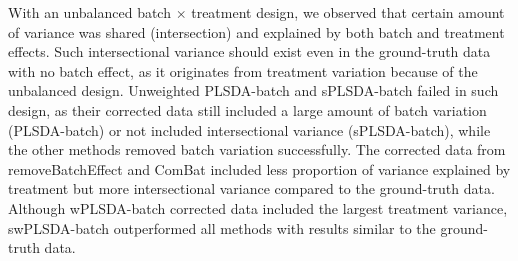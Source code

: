 \documentclass[
]{book}
\begin{document}
With an unbalanced batch \(\times\) treatment design, we observed that certain amount of variance was shared (intersection) and explained by both batch and treatment effects. Such intersectional variance should exist even in the ground-truth data with no batch effect, as it originates from treatment variation because of the unbalanced design. Unweighted PLSDA-batch and sPLSDA-batch failed in such design, as their corrected data still included a large amount of batch variation (PLSDA-batch) or not included intersectional variance (sPLSDA-batch), while the other methods removed batch variation successfully. The corrected data from removeBatchEffect and ComBat included less proportion of variance explained by treatment but more intersectional variance compared to the ground-truth data. Although wPLSDA-batch corrected data included the largest treatment variance, swPLSDA-batch outperformed all methods with results similar to the ground-truth data.
\end{document}
